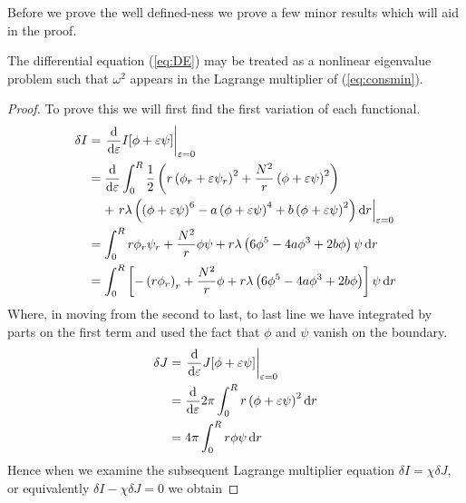 Before we prove the well defined-ness we prove a few minor results which will
aid in the proof.
\begin{lemma}\label{lem:nonlineig}
    The differential equation (\ref{eq:DE}) may be treated as a nonlinear
    eigenvalue problem such that \(\omega^2\) appears in the Lagrange multiplier
    of (\ref{eq:consmin}).
\end{lemma}
\begin{proof}
    To prove this we will first find the first variation of each functional.
    \begin{align}
        \delta I & = \left.\dv{\varepsilon}I[\phi + \varepsilon\psi]\right|_{\varepsilon = 0} \nonumber                                                                                                                         \\
                 & = \dv{\varepsilon}\int_0^R \frac{1}{2}\left(r\left(\phi_r + \varepsilon\psi_r\right)^2 + \frac{N^2}{r}\left(\phi + \varepsilon\psi\right)^2\right) \nonumber                                                 \\
                 & \phantom{=}\,\,+ \left.r\lambda\left(\left(\phi + \varepsilon\psi\right)^6 - a\left(\phi + \varepsilon\psi\right)^4 + b\left(\phi + \varepsilon\psi\right)^2\right)\dd{r}\right|_{\varepsilon = 0} \nonumber \\
                 & = \int_0^R r\phi_r\psi_r + \frac{N^2}{r}\phi\psi + r\lambda\left(6\phi^5 - 4a\phi^3 + 2b\phi\right)\psi\dd{r} \nonumber                                                                                      \\
                 & = \int_0^R\left[-\left(r\phi_r\right)_r + \frac{N^2}{r}\phi + r\lambda\left(6\phi^5 - 4a\phi^3 + 2b\phi\right)\right]\psi\dd{r}
    \end{align}
    Where, in moving from the second to last, to last line we have integrated by
    parts on the first term and used the fact that \(\phi\) and \(\psi\) vanish
    on the boundary.
    \begin{align}
        \delta J & = \left.\dv{\varepsilon}J[\phi + \varepsilon\psi]\right|_{\varepsilon = 0} \nonumber  \\
                 & = \dv{\varepsilon}2\pi\int_0^R r\left(\phi + \varepsilon\psi\right)^2\dd{r} \nonumber \\
                 & = 4\pi\int_0^R r\phi\psi\dd{r}
    \end{align}
    Hence when we examine the subsequent Lagrange multiplier equation \(\delta I = \chi\delta J\), or equivalently \(\delta I - \chi\delta J = 0\) we obtain

\end{proof}
